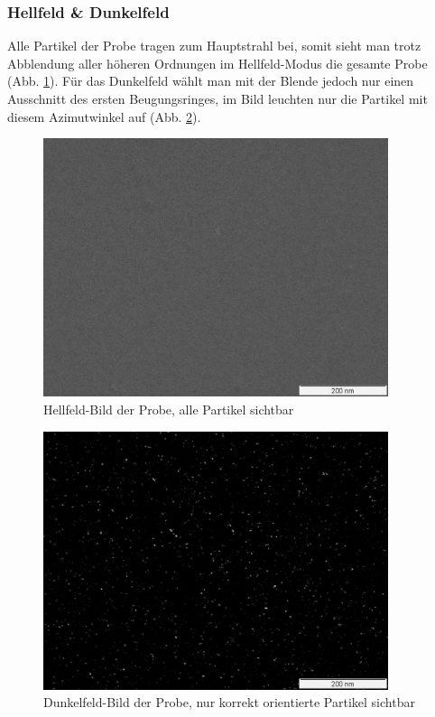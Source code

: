 \subsubsection{Hellfeld \& Dunkelfeld}
Alle Partikel der Probe tragen zum Hauptstrahl bei, somit sieht man trotz Abblendung aller höheren Ordnungen im Hellfeld-Modus die gesamte Probe (Abb. \ref{fig:TEM_Hell}). Für das Dunkelfeld wählt man mit der Blende jedoch nur einen Ausschnitt des ersten Beugungsringes, im Bild leuchten nur die Partikel mit diesem Azimutwinkel auf (Abb. \ref{fig:TEM_Dunkel}).

\begin{figure}[p]
	\centering
	\includegraphics[width=0.9\textwidth]{data/Im_11.jpg}
	\caption{Hellfeld-Bild der Probe, alle Partikel sichtbar}					\label{fig:TEM_Hell}
\end{figure}

\begin{figure}[p]
	\centering
	\includegraphics[width=0.9\textwidth]{data/Im_14b.jpg}
	\caption{Dunkelfeld-Bild der Probe, nur korrekt orientierte Partikel sichtbar}	\label{fig:TEM_Dunkel}
	\vspace{-3em}
\end{figure}




